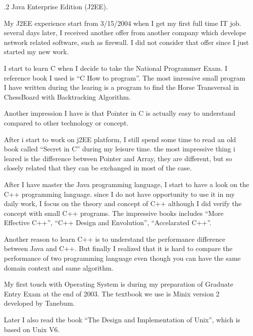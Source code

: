 .2 Java Enterprise Edition (J2EE).\par
My J2EE experience start from 3/15/2004 when I get my first full time IT job. several days 
later, I received another offer from another company which develope network related software, such 
as firewall. I did not consider that offer since I just started my new work.

\smallskip\noindent
{}\par
 I start to learn C when I decide to take the National Programmer Exam.
I reference book I used is ``C How to program''. The most imressive small 
program I have written during the learing is a program to find the Horse 
Transversal in ChessBoard with Backtracking Algorithm.

Another impression I have is that Pointer in C is actually easy to understand compared to 
other technology or concept. 

After i start to work on j2EE platform, I still spend some time to read an old book called
``Secret in C'' during my leisure time. the most impressive thing i leared is the 
difference between Pointer and Array, they are different, but so closely related 
that they can be exchanged in most of the case.

\smallskip\noindent
{}\par
 After I have master the Java programming language, I start to have
a look on the C++ programming language. since I do not have opportunity to 
use it in my daily work, I focus on the theory and concept of C++ although I did
verify the concept with small C++ programs. The impressive books includes 
``More Effective C++'', ``C++ Design and Envolution'', ``Accelarated C++''.

Another reason to learn C++ is to understand the performance difference 
between Java and C++. But finally I realized that it is hard to compare 
the performance of two programming language even though you can have the 
same domain context and same algorithm.

{}

My first touch with Operating System is during my preparation of Graduate Entry
Exam at the end of 2003. The textbook we use is Minix version 2 developed by 
Tanebum.%

Later I also read the book ``The Design and Implementation of Unix'', which is
 based on Unix V6.


